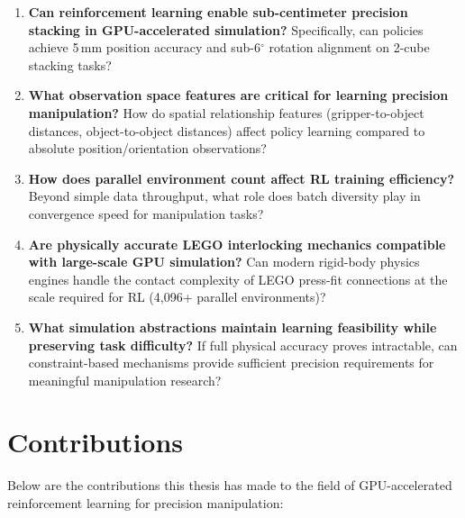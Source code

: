 \documentclass[12pt,a4paper,oneside]{report}
\begin{document}
\begin{enumerate}
    \item \textbf{Can reinforcement learning enable sub-centimeter precision stacking in GPU-accelerated simulation?} Specifically, can policies achieve 5\,mm position accuracy and sub-6$^\circ$ rotation alignment on 2-cube stacking tasks?

    \item \textbf{What observation space features are critical for learning precision manipulation?} How do spatial relationship features (gripper-to-object distances, object-to-object distances) affect policy learning compared to absolute position/orientation observations?

    \item \textbf{How does parallel environment count affect RL training efficiency?} Beyond simple data throughput, what role does batch diversity play in convergence speed for manipulation tasks?

    \item \textbf{Are physically accurate LEGO interlocking mechanics compatible with large-scale GPU simulation?} Can modern rigid-body physics engines handle the contact complexity of LEGO press-fit connections at the scale required for RL (4{,}096+ parallel environments)?

    \item \textbf{What simulation abstractions maintain learning feasibility while preserving task difficulty?} If full physical accuracy proves intractable, can constraint-based mechanisms provide sufficient precision requirements for meaningful manipulation research?
\end{enumerate}

\section{Contributions}

Below are the contributions this thesis has made to the field of GPU-accelerated reinforcement learning for precision manipulation:
\end{document}
